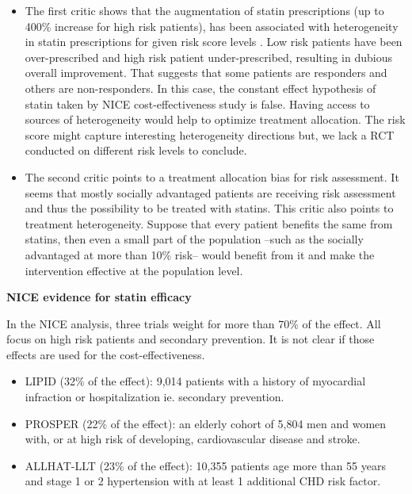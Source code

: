 \documentclass[10pt,letterpaper]{article}
\begin{document}
\begin{itemize}
  \item The first critic shows that the augmentation of statin prescriptions
        (up to 400\% increase for high risk patients), has been associated with
        heterogeneity in statin prescriptions for given risk score levels
        \cite{van2013efficiency}. Low risk patients have been over-prescribed
        and high risk patient under-prescribed, resulting in dubious overall
        improvement. That suggests that some patients are responders and
        others are non-responders. In this case, the constant effect
        hypothesis of statin taken by NICE cost-effectiveness study is false.
        Having access to sources of heterogeneity would help to optimize
        treatment allocation. The risk score might capture interesting
        heterogeneity directions but, we lack a RCT conducted on different
        risk levels to conclude.

  \item  The second critic points to a treatment allocation bias for risk
        assessment. It seems that mostly socially advantaged patients are
        receiving risk assessment and thus the possibility to be treated with
        statins. This critic also points to treatment heterogeneity.
        Suppose that every patient benefits the same from statins, then even a
        small part of the population --such as the socially advantaged at more
        than 10\% risk-- would benefit from it and make the intervention
        effective at the population level.
\end{itemize}



\textbf{NICE evidence for statin efficacy}

In the NICE analysis, three trials weight for more than 70\% of the effect. All
focus on high risk patients and secondary prevention. It is not clear if
those effects are used for the cost-effectiveness.

\begin{itemize}
  \item LIPID \cite{long1998prevention} (32\% of the effect): 9,014 patients with a history of
        myocardial infraction or hospitalization ie. secondary prevention.
  \item PROSPER \cite{shepherd2002pravastatin} (22\% of the effect): an elderly cohort of
        5,804 men and women with, or at high risk of developing, cardiovascular
        disease and stroke.
  \item ALLHAT-LLT \cite{antihypertensive2002major} (23\% of the effect): 10,355 patients age more than 55
        years and stage 1 or 2 hypertension with at least 1 additional CHD risk
        factor.
\end{itemize}
\clearpage
\end{document}
